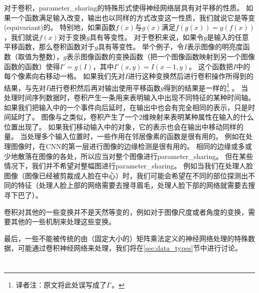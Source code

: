 对于卷积，\gls{parameter_sharing}的特殊形式使得神经网络层具有对平移的性质。
如果一个函数满足输入改变，输出也以同样的方式改变这一性质，我们就说它是等变(equivariant)的。
特别地，如果函数$f(x)$与$g(x)$满足$f(g(x))= g(f(x))$，我们就说$f(x)$对于变换$g$具有等变性。
对于卷积来说，如果令$g$是输入的任意平移函数，那么卷积函数对于$g$具有等变性。
举个例子，令$I$表示图像的明亮度函数（取值为整数），$g$表示图像函数的变换函数（把一个图像函数映射到另一个图像函数的函数）使得$I' = g(I)$，其中$I'(x,y) = I(x-1, y)$。
这个函数把$I$中的每个像素向右移动一格。
如果我们先对$I$进行这种变换然后进行卷积操作所得到的结果，与先对$I$进行卷积然后再对输出使用平移函数$g$得到的结果是一样的\footnote{译者注：原文将此处误写成了$I'$。} 。%
当处理时间序列数据时，卷积产生一条用来表明输入中出现不同特征的某种时间轴。
如果我们把输入中的一个事件向后延时，在输出中也会有完全相同的表示，只是时间延时了。
图像与之类似，卷积产生了一个2维映射来表明某种属性在输入的什么位置出现了。
如果我们移动输入中的对象，它的表示也会在输出中移动同样的量。
当处理多个输入位置时，一些作用在邻居像素的函数是很有用的。
例如在处理图像时，在\gls{CNN}的第一层进行图像的边缘检测是很有用的。
相同的边缘或多或少地散落在图像的各处，所以应当对整个图像进行\gls{parameter_sharing}。
但在某些情况下，我们并不希望对整幅图进行\gls{parameter_sharing}。
例如当我们在处理人脸图像（图像已经被剪裁成人脸在中心）时，我们可能会希望在不同的部位探测出不同的特征（处理人脸上部的网络需要去搜寻眉毛，处理人脸下部的网络就需要去搜寻下巴了）。

 
卷积对其他的一些变换并不是天然等变的，例如对于图像尺度或者角度的变换，需要其他的一些机制来处理这些变换。

最后，一些不能被传统的由（固定大小的）矩阵乘法定义的神经网络处理的特殊数据，可能通过卷积神经网络来处理，我们将在\ref{sec:data_types}节中进行讨论。

\section{}
\label{sec:pooling}

